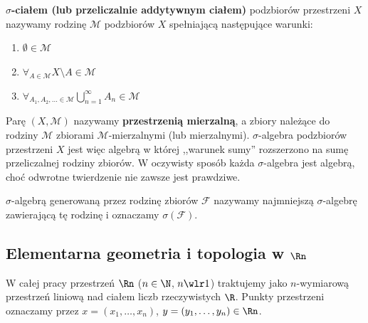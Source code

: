 \begin{defi}
    \textbf{$\sigma$-ciałem (lub przeliczalnie addytywnym ciałem)} podzbiorów przestrzeni $X$ nazywamy rodzinę $\mathcal{M}$ podzbiorów $X$ spełniającą następujące warunki:
    \begin{enumerate}
        \item $\emptyset \in \mathcal{M}$
        \item $\forall_{A \in \mathcal{M}} X \setminus A \in \mathcal{M}$
        \item $\forall_{A_1, A_2, \ldots \in \mathcal{M}} \bigcup_{n = 1}^\infty A_n \in \mathcal{M}$
    \end{enumerate}
    Parę $(X, \mathcal{M})$ nazywamy \textbf{przestrzenią mierzalną}, a zbiory należące do rodziny $\mathcal{M}$ zbiorami $\mathcal{M}$-mierzalnymi (lub mierzalnymi).
    $\sigma$-algebra podzbiorów przestrzeni $X$ jest więc algebrą w której ,,warunek sumy'' rozszerzono na sumę przeliczalnej rodziny zbiorów. W oczywisty sposób każda $\sigma$-algebra jest algebrą, choć odwrotne twierdzenie nie zawsze jest prawdziwe.
\end{defi}

\begin{defi}
    $\sigma$-algebrą generowaną przez rodzinę zbiorów $\mathcal{F}$ nazywamy najmniejszą $\sigma$-algebrę zawierającą tę rodzinę i oznaczamy $\sigma(\mathcal{F})$.
\end{defi}

\subsection{Elementarna geometria i topologia w $\Rn$}

W całej pracy przestrzeń $\Rn$ ($n \in \N$, $n \wlr 1$) traktujemy jako $n$-wymiarową przestrzeń liniową nad ciałem liczb rzeczywistych $\R$. Punkty przestrzeni oznaczamy przez $x = (x_1, \ldots, x_n)$, $y = (y_1, \ldots, y_n) \in \Rn$.

